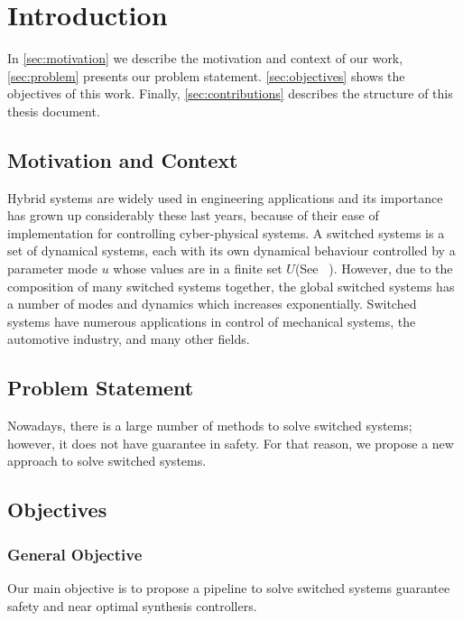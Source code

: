     \chapter{Introduction}
    
    \label{ch:intro}
    In \autoref{sec:motivation} we describe the motivation and 
    context of our work, \autoref{sec:problem} presents our 
    problem statement. \autoref{sec:objectives} shows the 
    objectives of this work. Finally, \autoref{sec:contributions}
    describes the structure of this thesis document.

    \section{Motivation and Context}
    \label{sec:motivation}

    Hybrid systems are widely used in engineering applications and its 
    importance has grown up considerably these last years, because of their 
    ease of implementation for controlling cyber-physical systems.
    A switched systems is a set of dynamical systems, each with its own 
    dynamical behaviour controlled by a parameter mode $u$ whose values 
    are in a finite set $U$(See ~\cite{liberzon2003switching}). However, due to the composition of many switched systems together, the global switched systems has a number of modes and dynamics which increases exponentially. 
    Switched systems have numerous applications in control of mechanical systems, the automotive industry, and many other fields. 

    \section{Problem Statement}
    \label{sec:problem}
    Nowadays, there is a large number of methods to solve switched systems;
    however, it does not have guarantee in safety. For that reason, we 
    propose a new approach to solve switched systems. 
    
    \section{Objectives}
    \label{sec:objectives}

        \subsection*{General Objective}
        Our main objective is to propose a pipeline to solve switched systems guarantee safety and near optimal synthesis controllers. 

